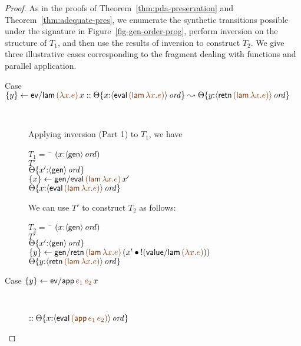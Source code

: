 \begin{proof} As in the proofs of Theorem~\ref{thm:pda-preservation}
  and Theorem~\ref{thm:adequate-pres}, we enumerate the synthetic
  transitions possible under the signature in
  Figure~\ref{fig-gen-order-prog}, perform inversion on the structure
  of $T_1$, and then use the results of inversion to construct
  $T_2$. We give three illustrative cases corresponding to the
  fragment dealing with functions and parallel application.

\begin{description}
\item 
  [Case $\trstep{y}{{\sf ev/lam}\,\lf{(\lambda x. e)}\,x}
   ::
   \tackon{\Theta}
     {x{:}\istrue{\susp{{\sf eval}\,\lf{({\sf lam}\,\lambda x.e)}}}}
   \leadsto
   \tackon{\Theta}
     {y{:}\istrue{\susp{{\sf retn}\,\lf{({\sf lam}\,\lambda x.e)}}}}$]~

\medskip
Applying inversion (Part 1) to $T_1$, we have 

\begin{tabbing}
$T_1 = ~$ \= \qquad \= $(x{:}{\langle {\sf gen} \rangle}\,{{\it ord}})$
\\
\>$T'$
\\
\>\>${\Theta}\{{x'{:}{\langle {\sf gen} \rangle}\,{{\it ord}}}\}$
\\
\>$\trstep{x}{{\sf gen/eval}\,\lf{({\sf lam}\,\lambda x.e)}\,x'}$
\\
\>\>$\tackon{\Theta}
       {x{:}\istrue{\susp{{\sf eval}\,\lf{({\sf lam}\,\lambda x.e)}}}}$
\end{tabbing}

We can use $T'$ to construct $T_2$ as follows:

\begin{tabbing}
$T_2 = ~$ \= \qquad \= $(x{:}{\langle {\sf gen} \rangle}\,{{\it ord}})$
\\
\>$T'$
\\
\>\>${\Theta}\{{x'{:}{\langle {\sf gen} \rangle}\,{{\it ord}}}\}$
\\
\>$\trstep{y}{{\sf gen/retn}\,\lf{({\sf lam}\,\lambda x.e)}\,(\tfuser{x'}{\tbangr{({\sf value/lam}\,\lf{(\lambda x.e)})}})}$
\\
\>\>$\tackon{\Theta}
     {y{:}\istrue{\susp{{\sf retn}\,\lf{({\sf lam}\,\lambda x.e)}}}}$
\end{tabbing}

\item 
  [Case $\trstep{y}{{\sf ev/app}\,\lf{e_1}\,\lf{e_2}\,x}$]~

\qquad
  $::
   \tackon{\Theta}
     {x{:}\istrue{\susp{{\sf eval}\,\lf{({\sf app}\,e_1\,e_2)}}}}$


\end{description}
\end{proof}

